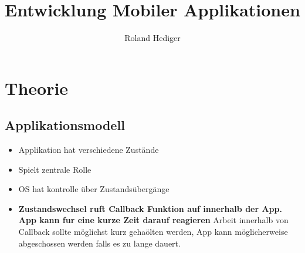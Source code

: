 \documentclass[a4paper,10pt]{scrreprt}
\title{Entwicklung Mobiler Applikationen}
\author{Roland Hediger}
\begin{document}
\maketitle
\tableofcontents
\pagestyle{fancy}
\part{Theorie}
\chapter{Applikationsmodell}
\begin{itemize}
 \item Applikation hat verschiedene Zustände
 \item Spielt zentrale Rolle
 \item OS hat kontrolle über Zustandsübergänge
 \item \textbf{Zustandswechsel ruft Callback Funktion auf innerhalb der App. App kann fur eine kurze Zeit darauf 
reagieren}
\subitem Arbeit innerhalb von Callback sollte möglichst kurz gehaölten werden, App kann möglicherweise abgeschossen 
werden falls es zu lange dauert.
\end{itemize}
\end{document}
